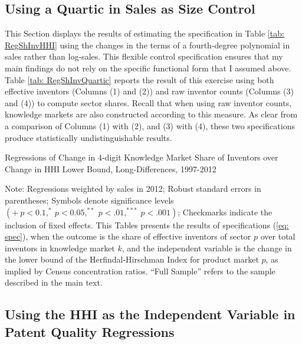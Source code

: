 \subsection{Using a Quartic in Sales as Size Control}

This Section displays the results of estimating the specification
in Table \ref{tab: RegShInvHHI} using the changes in the terms of
a fourth-degree polynomial in sales rather than log-sales. This flexible
control specification ensures that my main findings do not rely on
the specific functional form that I assumed above. Table \ref{tab: RegShInvQuartic}
reports the result of this exercise using both effective inventors
(Columns (1) and (2)) and raw inventor counts (Columns (3) and (4))
to compute sector shares. Recall that when using raw inventor counts,
knowledge markets are also constructed according to this measure.
As clear from a comparison of Columns (1) with (2), and (3) with (4),
these two specifications produce statistically undistinguishable results.

\begin{table}[th]
\caption{Regressions of Change in 4-digit Knowledge Market Share of Inventors
over Change in HHI Lower Bound, Long-Differences, 1997-2012\label{tab: RegShInvQuartic}}

\begin{centering}
\scalebox{.9}{}
\par\end{centering}
\raggedright{}{\small{}Note: Regressions weighted by sales in 2012;
Robust standard errors in parentheses; Symbols denote significance
levels $\left(+\ p<0.1,^{*}\ p<0.05,^{**}\ p<.01,^{***}\ p<.001\right)$;
Checkmarks indicate the inclusion of fixed effects. This Tables presents
the results of specifications (\ref{eq: spec}), when the outcome
is the share of effective inventors of sector $p$ over total inventors
in knowledge market $k$, and the independent variable is the change
in the lower bound of the Herfindal-Hirschman Index for product market
$p$, as implied by Census concentration ratios. ``Full Sample''
refers to the sample described in the main text.}{\small\par}
\end{table}


\subsection{Using the HHI as the Independent Variable in Patent Quality Regressions\label{subsec:Patents-with-HHI}}


